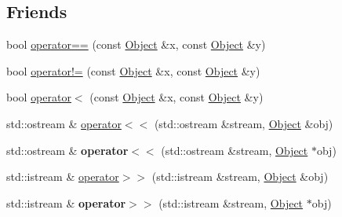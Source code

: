 \subsection*{Friends}
\begin{DoxyCompactItemize}
\item 
bool \hyperlink{classez_1_1objects_1_1Object_a2e452c05c348d53615e96b58089a9732}{operator==} (const \hyperlink{classez_1_1objects_1_1Object}{Object} \&x, const \hyperlink{classez_1_1objects_1_1Object}{Object} \&y)
\item 
bool \hyperlink{classez_1_1objects_1_1Object_ade135c5015a5ee3d22d1cfd37c631603}{operator!=} (const \hyperlink{classez_1_1objects_1_1Object}{Object} \&x, const \hyperlink{classez_1_1objects_1_1Object}{Object} \&y)
\item 
bool \hyperlink{classez_1_1objects_1_1Object_a6f011ffc58727a1b133e9cace6f5d79a}{operator$<$} (const \hyperlink{classez_1_1objects_1_1Object}{Object} \&x, const \hyperlink{classez_1_1objects_1_1Object}{Object} \&y)
\item 
std\+::ostream \& \hyperlink{classez_1_1objects_1_1Object_a8c4aa17f8cf91b04c722b994a7028999}{operator$<$$<$} (std\+::ostream \&stream, \hyperlink{classez_1_1objects_1_1Object}{Object} \&obj)
\item 
\mbox{\label{classez_1_1objects_1_1Object_a94a0a68ffafad7b7d5737f63559707bb}} 
std\+::ostream \& {\bfseries operator$<$$<$} (std\+::ostream \&stream, \hyperlink{classez_1_1objects_1_1Object}{Object} $\ast$obj)
\item 
std\+::istream \& \hyperlink{classez_1_1objects_1_1Object_ae68a9d9e998a5694b42898cb6730cd08}{operator$>$$>$} (std\+::istream \&stream, \hyperlink{classez_1_1objects_1_1Object}{Object} \&obj)
\item 
\mbox{\label{classez_1_1objects_1_1Object_a53c33202998cb89622f59494425b4570}} 
std\+::istream \& {\bfseries operator$>$$>$} (std\+::istream \&stream, \hyperlink{classez_1_1objects_1_1Object}{Object} $\ast$obj)
\end{DoxyCompactItemize}



